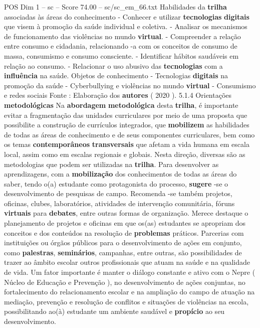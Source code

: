 \begin{textsample}{POS Dim 1 – sc – Score 74.00 – sc/sc\_em\_66.txt}
Habilidades da \textbf{trilha} associadas às áreas do conhecimento - Conhecer e utilizar \textbf{tecnologias} \textbf{digitais} que visem à promoção da saúde individual e coletiva. - Analisar os mecanismos de funcionamento das violências no mundo \textbf{virtual}. - Compreender a relação entre consumo e cidadania, relacionando -a com os conceitos de consumo de massa, consumismo e consumo consciente. - Identificar hábitos saudáveis em relação ao consumo. - Relacionar o uso abusivo das \textbf{tecnologias} com a \textbf{influência} na saúde.
Objetos de conhecimento - Tecnologias \textbf{digitais} na promoção da saúde - Cyberbullying e violências no mundo \textbf{virtual} - Consumismo e redes sociais Fonte : Elaboração dos \textbf{autores} ( 2020 ). 5.1.4 Orientações \textbf{metodológicas} Na \textbf{abordagem} \textbf{metodológica} desta \textbf{trilha}, é importante evitar a fragmentação das unidades curriculares por meio de uma proposta que possibilite a construção de currículos integrados, que \textbf{mobilizem} as habilidades de todas as áreas de conhecimento e de seus componentes curriculares, bem como os temas \textbf{contemporâneos} \textbf{transversais} que afetam a vida humana em escala local, assim como em escalas regionais e globais.
Nesta direção, diversas são as metodologias que podem ser utilizadas na \textbf{trilha}.
Para desenvolver as aprendizagens, com a \textbf{mobilização} dos conhecimentos de todas as áreas do saber, tendo o(a) estudante como protagonista do processo, \textbf{sugere} -se o desenvolvimento de pesquisas de campo.
Recomenda -se também projetos, oficinas, clubes, laboratórios, atividades de intervenção comunitária, fóruns \textbf{virtuais} para \textbf{debates}, entre outras formas de organização.
Merece destaque o planejamento de projetos e oficinas em que os(as) estudantes se apropriam dos conceitos e dos conteúdos na resolução de \textbf{problemas} práticos.
Parcerias com instituições ou órgãos públicos para o desenvolvimento de ações em conjunto, como \textbf{palestras}, \textbf{seminários}, campanhas, entre outras, são possibilidades de trazer ao âmbito escolar outros profissionais que atuam na saúde e na qualidade de vida.
Um fator importante é manter o diálogo constante e ativo com o Nepre ( Núcleo de Educação e Prevenção ), no desenvolvimento de ações conjuntas, no fortalecimento do relacionamento escolar e na ampliação do campo de atuação na mediação, prevenção e resolução de conflitos e situações de violências na escola, possibilitando ao(à) estudante um ambiente saudável e \textbf{propício} ao seu desenvolvimento.

\end{textsample}
